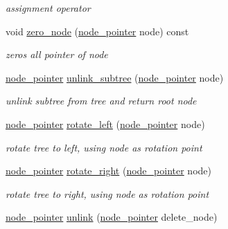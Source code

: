 \begin{DoxyCompactItemize}
\begin{DoxyCompactList}\small\item\em assignment operator \end{DoxyCompactList}\item 
void \hyperlink{structcrap_1_1tree__node_abda754dbd964ad83afad3c1d70c14fbe}{zero\-\_\-node} (\hyperlink{structcrap_1_1tree__node_a66cd96114fc5aaf9806032e15960edc5}{node\-\_\-pointer} node) const 
\begin{DoxyCompactList}\small\item\em zeros all pointer of node \end{DoxyCompactList}\item 
\hyperlink{structcrap_1_1tree__node_a66cd96114fc5aaf9806032e15960edc5}{node\-\_\-pointer} \hyperlink{structcrap_1_1tree__node_a8981c1dda58282de4050e488e6c334e4}{unlink\-\_\-subtree} (\hyperlink{structcrap_1_1tree__node_a66cd96114fc5aaf9806032e15960edc5}{node\-\_\-pointer} node)
\begin{DoxyCompactList}\small\item\em unlink subtree from tree and return root node \end{DoxyCompactList}\item 
\hyperlink{structcrap_1_1tree__node_a66cd96114fc5aaf9806032e15960edc5}{node\-\_\-pointer} \hyperlink{structcrap_1_1tree__node_a6f677f4fcf5a7a7ce7ec1c4d3abf81d5}{rotate\-\_\-left} (\hyperlink{structcrap_1_1tree__node_a66cd96114fc5aaf9806032e15960edc5}{node\-\_\-pointer} node)
\begin{DoxyCompactList}\small\item\em rotate tree to left, using node as rotation point \end{DoxyCompactList}\item 
\hyperlink{structcrap_1_1tree__node_a66cd96114fc5aaf9806032e15960edc5}{node\-\_\-pointer} \hyperlink{structcrap_1_1tree__node_a8fc584aea6fa816534a368275f30004d}{rotate\-\_\-right} (\hyperlink{structcrap_1_1tree__node_a66cd96114fc5aaf9806032e15960edc5}{node\-\_\-pointer} node)
\begin{DoxyCompactList}\small\item\em rotate tree to right, using node as rotation point \end{DoxyCompactList}\item 
\hyperlink{structcrap_1_1tree__node_a66cd96114fc5aaf9806032e15960edc5}{node\-\_\-pointer} \hyperlink{structcrap_1_1tree__node_a53ea3e0b2258d6cdba1bcaeb9387ca42}{unlink} (\hyperlink{structcrap_1_1tree__node_a66cd96114fc5aaf9806032e15960edc5}{node\-\_\-pointer} delete\-\_\-node)

\end{DoxyCompactItemize}
